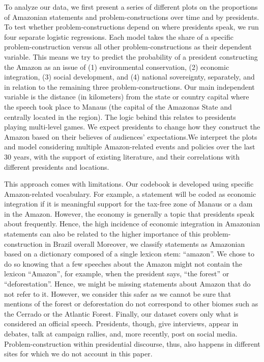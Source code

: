 \documentclass[
  12pt,
]{article}
\begin{document}
To analyze our data, we first present a series of different plots on the
proportions of Amazonian statements and problem-constructions over time
and by presidents. To test whether problem-constructions depend on where
presidents speak, we run four separate logistic regressions. Each model
takes the share of a specific problem-construction versus all other
problem-constructions as their dependent variable. This means we try to
predict the probability of a president constructing the Amazon as an
issue of (1) environmental conservation, (2) economic integration, (3)
social development, and (4) national sovereignty, separately, and in
relation to the remaining three problem-constructions. Our main
independent variable is the distance (in kilometers) from the state or
country capital where the speech took place to Manaus (the capital of
the Amazonas State and centrally located in the region). The logic
behind this relates to presidents playing multi-level games. We expect
presidents to change how they construct the Amazon based on their
believes of audiences' expectations.We interpret the plots and model
considering multiple Amazon-related events and policies over the last 30
years, with the support of existing literature, and their correlations
with different presidents and locations.

This approach comes with limitations. Our codebook is developed using
specific Amazon-related vocabulary. For example, a statement will be
coded as economic integration if it is meaningful support for the
tax-free zone of Manaus or a dam in the Amazon. However, the economy is
generally a topic that presidents speak about frequently. Hence, the
high incidence of economic integration in Amazonian statements can also
be related to the higher importance of this problem-construction in
Brazil overall Moreover, we classify statements as Amazonian based on a
dictionary composed of a single lexicon stem: ``amazon''. We chose to do
so knowing that a few speeches about the Amazon might not contain the
lexicon ``Amazon'', for example, when the president says, ``the forest''
or ``deforestation''. Hence, we might be missing statements about Amazon
that do not refer to it. However, we consider this safer as we cannot be
sure that mentions of the forest or deforestation do not correspond to
other biomes such as the Cerrado or the Atlantic Forest. Finally, our
dataset covers only what is considered an official speech. Presidents,
though, give interviews, appear in debates, talk at campaign rallies,
and, more recently, post on social media. Problem-construction within
presidential discourse, thus, also happens in different sites for which
we do not account in this paper.
\end{document}
